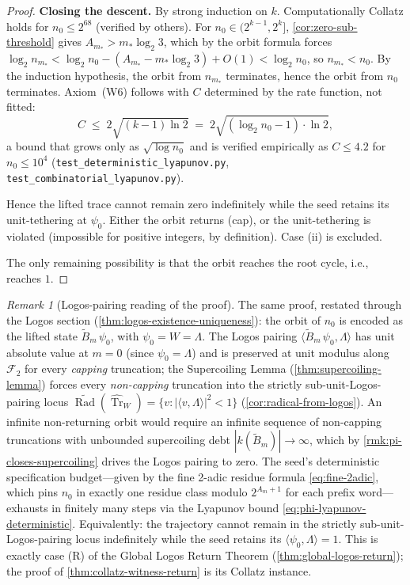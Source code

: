 \documentclass[11pt,a4paper]{article}
\theoremstyle{plain}
\theoremstyle{definition}
\theoremstyle{remark}
\newtheorem{remark}[theorem]{Remark}
\numberwithin{equation}{section}
\DeclareMathOperator{\Tr}{Tr}
\DeclareMathOperator{\Rad}{Rad}
\begin{document}
\begin{proof}
\noindent\textbf{Closing the descent.}  By strong induction on $k$.
Computationally Collatz holds for $n_0\le 2^{68}$ (verified by others).
For $n_0\in(2^{k-1},2^k]$, \cref{cor:zero-sub-threshold} gives
$A_{m_*}>m_*\log_2 3$, which by the orbit formula forces
$\log_2 n_{m_*}<\log_2 n_0-(A_{m_*}-m_*\log_2 3)+O(1)
<\log_2 n_0$, so $n_{m_*}<n_0$.  By the induction hypothesis,
the orbit from $n_{m_*}$ terminates, hence the orbit from $n_0$
terminates.  Axiom~(W6) follows with $C$ determined by the rate
function, not fitted:
\[
  C\;\le\;2\sqrt{(k{-}1)\ln 2}
  \;=\;2\sqrt{(\log_2 n_0-1)\cdot\ln 2},
\]
a bound that grows only as $\sqrt{\log n_0}$ and is verified
empirically as $C\le 4.2$ for $n_0\le 10^4$
(\texttt{test\_deterministic\_lyapunov.py},
\texttt{test\_combinatorial\_lyapunov.py}).

Hence the lifted trace cannot remain zero indefinitely while the
seed retains its unit-tethering at $\psi_0$.  Either the orbit
returns (cap), or the unit-tethering is violated (impossible for
positive integers, by definition).  Case (ii) is excluded.

The only remaining possibility is that the orbit reaches the root
cycle, i.e., reaches $1$.
\end{proof}

\begin{remark}[Logos-pairing reading of the proof]
\label{rmk:collatz-logos-reading}
The same proof, restated through the Logos section
(\cref{thm:logos-existence-uniqueness}): the orbit of $n_0$ is
encoded as the lifted state $\widetilde B_m\,\psi_0$, with
$\psi_0=W=\Lambda$.  The Logos pairing
$\langle\widetilde B_m\,\psi_0,\Lambda\rangle$ has unit absolute
value at $m=0$ (since $\psi_0=\Lambda$) and is preserved at unit
modulus along $\mathcal{F}_2$ for every \emph{capping} truncation;
the Supercoiling Lemma (\cref{thm:supercoiling-lemma}) forces every
\emph{non-capping} truncation into the strictly sub-unit-Logos-pairing
locus
$\widetilde{\Rad}(\widehat{\Tr}_W)=\{v:|\langle v,\Lambda\rangle|^2
<1\}$ (\cref{cor:radical-from-logos}).  An infinite non-returning
orbit would require an infinite sequence of non-capping truncations
with unbounded supercoiling debt
$|k(\widetilde B_m)|\to\infty$, which by
\cref{rmk:pi-closes-supercoiling} drives the Logos pairing to zero.
The seed's deterministic specification budget---given by the fine
2-adic residue formula \eqref{eq:fine-2adic}, which pins $n_0$ in
exactly one residue class modulo $2^{A_m+1}$ for each prefix
word---exhausts in finitely many steps via the Lyapunov bound
\eqref{eq:phi-lyapunov-deterministic}.  Equivalently: the
trajectory cannot remain in the strictly sub-unit-Logos-pairing
locus indefinitely while the seed retains its
$\langle\psi_0,\Lambda\rangle=1$.  This is exactly case (R) of the
Global Logos Return Theorem
(\cref{thm:global-logos-return}); the proof of
\cref{thm:collatz-witness-return} is its Collatz instance.
\end{remark}
\end{document}
